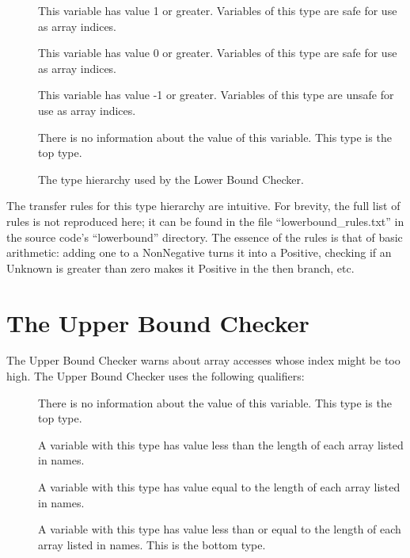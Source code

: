\begin{description}
\item[]
  This variable has value 1 or greater.
  Variables of this type are safe for use as array indices.
\item[]
  This variable has value 0 or greater.
  Variables of this type are safe for use as array indices.
\item[]
  This variable has value -1 or greater.
  Variables of this type are unsafe for use as array indices.
\item[]
  There is no information about the value of this variable.
  This type is the top type.
\end{description}

\begin{figure}
\caption{The type hierarchy used by the Lower Bound Checker.}
\label{fig-lowerbound-types}
\end{figure}

The transfer rules for this type hierarchy are intuitive. For brevity,
the full list of rules is not reproduced here; it can be found in the file
``lowerbound\_rules.txt'' in the source code's ``lowerbound'' directory.
The essence of the rules is that of basic arithmetic: adding one to a
NonNegative turns it into a Positive, checking if an Unknown is greater
than zero makes it Positive in the then branch, etc.

\section{The Upper Bound Checker\label{index-upperbound}}

The Upper Bound Checker warns about array accesses whose index might be
too high. The Upper Bound Checker uses the following
qualifiers:

\begin{description}
\item[]
  There is no information about the value of this variable.
  This type is the top type.
\item[]
  A variable with this type
  has value less than the length of each array listed in names.
\item[]
  A variable with this type
  has value equal to the length of each array listed in names.
\item[]
  A variable with this type
  has value less than or equal to the length of each array listed in names.
  This is the bottom type.
\end{description}
